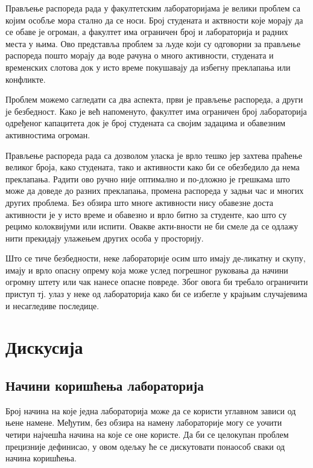 \documentclass[a4paper, 12pt, diplomski]{etfcyr}
\begin{document}
		\begin{justify}
			Прављење распореда рада у факултетским лабораторијама је велики проблем са којим особље мора стално да се носи. Број студената и актвности које морају да се обаве је огроман, а факултет има ограничен број и лабораторија и радних места у њима. Ово представља проблем за људе који су одговорни за прављење распореда пошто морају да воде рачуна о много активности, студената и временских слотова док у исто време покушавају да избегну преклапања или конфликте.

			Проблем можемо сагледати са два аспекта, први је прављење распореда, а други је безбедност. Како је већ напоменуто, факултет има ограничен број лабораторија одређеног капацитета док је број студената са својим задацима и обавезним активностима огроман.

			Прављење распореда рада са дозволом уласка је врло тешко јер захтева праћење великог броја, како студената, тако и активности како би се обезбедило да нема преклапања. Радити ово ручно није оптимално и по-дложно је грешкама што може да доведе до разних преклапања, промена распореда у задњи час и многих других проблема. Без обзира што многе активности нису обавезне доста активности је у исто време и обавезно и врло битно за студенте, као што су рецимо колоквијуми или испити. Овакве акти-вности не би смеле да се одлажу нити прекидају улажењем других особа у просторију.

			Што се тиче безбедности, неке лабораторије осим што имају де-ликатну и скупу, имају и врло опасну опрему која може услед погрешног руковања да начини огромну штету или чак нанесе опасне повреде. Због овога би требало ограничити приступ тј. улаз у неке од лабораторија како би се избегле у крајњим случајевима и несагледиве последице.
		\end{justify}

	\chapter{Дискусија}

		\section{Начини коришћења лабораторија}

			\begin{justify}
				Број начина на које једна лабораторија може да се користи углавном зависи од њене намене. Међутим, без обзира на намену лабораторије могу се уочити четири најчешћа начина на које се оне користе. Да би се целокупан проблем прецизније дефинисао, у овом одељку ће се дискутовати понаособ сваки од начина коришћења.
			\end{justify}
\end{document}
